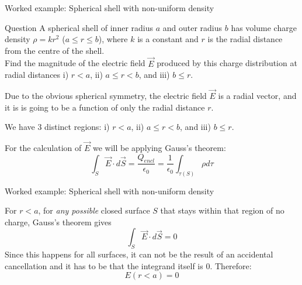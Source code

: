 
%
%

{
\problemslide

\begin{frame}{Worked example: Spherical shell with non-uniform density}

  \begin{blockexmplque}{Question}
    A spherical shell of inner radius $a$ and outer radius $b$ has volume charge
    density $\rho = kr^2$ ($a \le r \le b$), where $k$ is a constant and $r$ is
    the radial distance from the centre of the shell.\\
    Find the magnitude of the electric field $\vec{E}$
    produced by this charge distribution
    at radial distances i) $r<a$, ii) $a \le r < b$, and iii) $b \le r$.
  \end{blockexmplque}

  \vspace{0.2cm}

  Due to the obvious spherical symmetry, the electric field $\vec{E}$
  is a radial vector, and it is
  is going to be a function of only the radial distance $r$.\\

  \vspace{0.2cm}

  We have 3 distinct regions:
  i) $r<a$, ii) $a \le r < b$, and iii) $b \le r$.
  \vspace{0.2cm}

  For the calculation of $\vec{E}$ we will be applying Gauss's theorem:
  \begin{equation*}
    \int_{S} \vec{E} \cdot d\vec{S} =
      \frac{Q_{encl}}{\epsilon_0} =
        \frac{1}{\epsilon_0} \int_{\tau(S)} \rho d\tau
  \end{equation*}

\end{frame}

%
%
%

\begin{frame}{Worked example: Spherical shell with non-uniform density}

  For $r<a$, for {\em any possible} closed surface $S$
  that stays within that region of no charge, Gauss's theorem gives
  \begin{equation*}
    \int_{S} \vec{E} \cdot d\vec{S} = 0
  \end{equation*}
  Since this happens for all surfaces, it can not be the result of an
  accidental cancellation and it has to be that the integrand itself is 0.
  Therefore:
  \begin{equation}
    E (r<a) = 0
  \end{equation}


\end{frame}}
